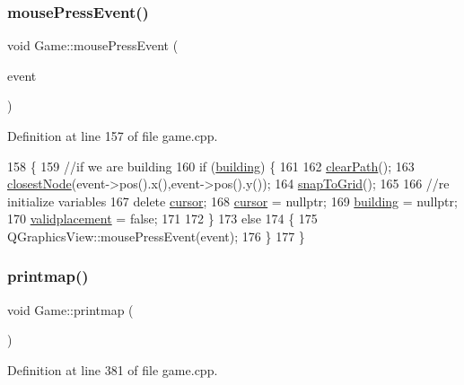 \subsubsection{\texorpdfstring{mouse\+Press\+Event()}{mousePressEvent()}}
{\footnotesize\ttfamily void Game\+::mouse\+Press\+Event (\begin{DoxyParamCaption}\item[{Q\+Mouse\+Event $\ast$}]{event }\end{DoxyParamCaption})}



Definition at line 157 of file game.\+cpp.


\begin{DoxyCode}
158 \{
159     \textcolor{comment}{//if we are building}
160     \textcolor{keywordflow}{if} (\hyperlink{class_game_a5917b4e021a93be7666ebc2ef4529401}{building}) \{
161 
162         \hyperlink{class_game_a06f5d66abdaae753db91ce7884c4e57d}{clearPath}();
163         \hyperlink{class_game_ae0adfbcc271a45a2c3ede2c6b948beda}{closestNode}(event->pos().x(),\textcolor{keyword}{event}->pos().y());
164         \hyperlink{class_game_a4e2cc66ce5004779048a6d8de19f0cdc}{snapToGrid}();
165 
166         \textcolor{comment}{//re initialize variables}
167         \textcolor{keyword}{delete} \hyperlink{class_game_ac8bde3bd16f503846f66bbb866c3b7b9}{cursor};
168         \hyperlink{class_game_ac8bde3bd16f503846f66bbb866c3b7b9}{cursor} = \textcolor{keyword}{nullptr};
169         \hyperlink{class_game_a5917b4e021a93be7666ebc2ef4529401}{building} = \textcolor{keyword}{nullptr};
170         \hyperlink{class_game_a06579845b7a93d8bf40efe5e7592b601}{validplacement} = \textcolor{keyword}{false};
171 
172     \}
173     \textcolor{keywordflow}{else}
174     \{
175         QGraphicsView::mousePressEvent(event);
176     \}
177 \}
\end{DoxyCode}
\mbox{\label{class_game_a07ca125130662de9c8f3bdd2f61db9c9}} 
\subsubsection{\texorpdfstring{printmap()}{printmap()}}
{\footnotesize\ttfamily void Game\+::printmap (\begin{DoxyParamCaption}{ }\end{DoxyParamCaption})}



Definition at line 381 of file game.\+cpp.



